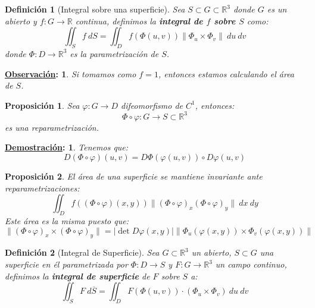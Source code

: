 \documentclass[10pt,a4paper,openright]{book}
\theoremstyle{break}
\newtheorem*{defi}{Definición}
\newtheorem*{prop}{Proposición}
\newtheorem*{demo}{\underline{Demostración}:}
\newtheorem*{obs}{\underline{Observación}:}
\newcommand{\dif}[1]{\ d#1}
\begin{document}
\begin{defi}[Integral sobre una superficie]
Sea $S \subset G \subset \mathbb{R}^3$ donde $G$ es un abierto y $f: G \rightarrow \mathbb{R}$ continua, definimos la \textbf{integral de $f$ sobre $S$} como: 
$$\iint_{S} f \dif{S} = \iint_{D} f\left( \Phi\left( u, v \right) \right) \lVert \Phi_u \times \Phi_v \rVert \dif{u} \dif{v}$$
donde $\Phi: D \rightarrow \mathbb{R}^3$ es la parametrización de $S$.
\end{defi}

\begin{obs}
Si tomamos como $f = 1$, entonces estamos calculando el área de $S$.
\end{obs}

\begin{prop}
Sea $\varphi: G \rightarrow D$ difeomorfismo de $C^1$, entonces: 
$$\Phi \circ \varphi: G \rightarrow S \subset \mathbb{R}^3$$
es una reparametrización.
\end{prop}
\begin{demo}
Tenemos que: 
$$D\left( \Phi \circ \varphi \right) \left( u, v \right) = D\Phi\left( \varphi\left( u, v \right) \right) \circ D\varphi\left( u, v \right)$$
\end{demo}

\begin{prop}
El área de una superficie se mantiene invariante ante reparametrizaciones:
$$\iint_{D} f\left( \left( \Phi \circ \varphi \right) \left( x, y \right) \right) \lVert \left( \Phi \circ \varphi \right)_x \left( \Phi \circ \varphi \right)_y \rVert \dif{x} \dif{y}$$
Este área es la misma puesto que:
$$\lVert \left( \Phi \circ \varphi \right)_x \times \left( \Phi \circ \varphi \right)_y \rVert = \lvert \det D \varphi\left( x, y \right) \rvert \lVert \Phi_u \left( \varphi\left( x, y \right) \right) \times \Phi_v \left( \varphi\left( x, y \right) \right) \rVert$$
\end{prop}

\begin{defi}[Integral de Superficie]
Sea $G \subset \mathbb{R}^3$ un abierto, $S \subset G$ una superficie en él parametrizada por $\Phi: D \rightarrow S$ y $F: G \rightarrow \mathbb{R}^3$ un campo continuo, definimos la \textbf{integral de superficie} de $F$ sobre $S$ a: 
$$\iint_{S} F \dif{\overline{S}} = \iint_{D} F\left( \Phi\left( u, v \right) \right) \cdot \left( \Phi_u \times \Phi_v \right) \dif{u} \dif{v}$$
\end{defi}
\end{document}
